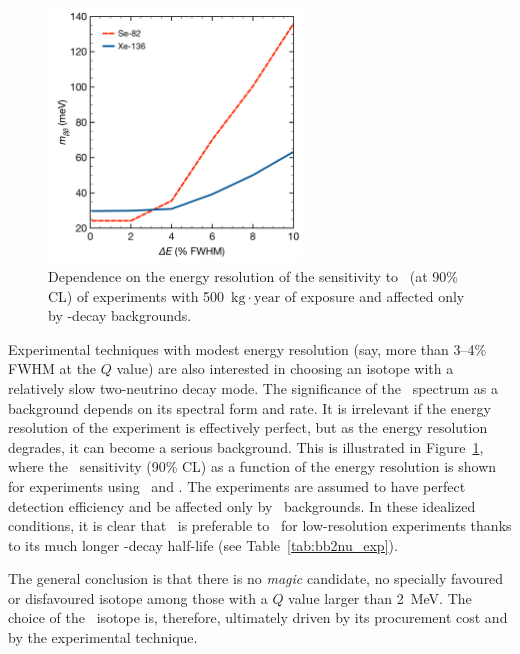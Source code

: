 \documentclass{PoS}
\begin{document}
\begin{figure}[p]
\centering
\includegraphics[width=0.6\textwidth]{img/SensitivityVsResolution.pdf}
\caption{Dependence on the energy resolution of the sensitivity to \mbb\ (at 90\% CL) of experiments with 500~$\mathrm{kg}\cdot\mathrm{year}$ of exposure and affected only by \bbtnu-decay backgrounds.} \label{fig:SensitivityVsResolution}
\end{figure}

Experimental techniques with modest energy resolution (say, more than 3--4\% FWHM at the $Q$ value) are also interested in choosing an isotope with a relatively slow two-neutrino decay mode. The significance of the \bbtnu\ spectrum as a background depends on its spectral form and rate. It is irrelevant if the energy resolution of the experiment is effectively perfect, but as the energy resolution degrades, it can become a serious background. This is illustrated in Figure~\ref{fig:SensitivityVsResolution}, where the \mbb\ sensitivity (90\% CL) as a function of the energy resolution is shown for experiments using \XE\ and \SE. The experiments are assumed to have perfect detection efficiency and be affected only by \bbtnu\ backgrounds. In these idealized conditions, it is clear that \XE\ is preferable to \SE\ for low-resolution experiments thanks to its much longer \bbtnu-decay half-life (see Table~\ref{tab:bb2nu_exp}).

The general conclusion is that there is no \emph{magic} candidate, no specially favoured or disfavoured isotope among those with a $Q$ value larger than 2~MeV. The choice of the \bb\ isotope is, therefore, ultimately driven by its procurement cost  and by the experimental technique.

\end{document}
